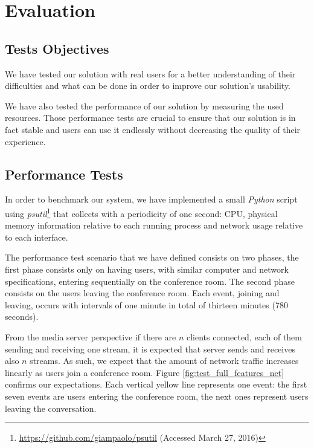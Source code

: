 \documentclass[conference,compsoc,a4paper]{IEEEtran}
\begin{document}
\section{Evaluation}


\subsection{Tests Objectives}

  We have tested our solution with real users for a better understanding of their difficulties and what can be done in order to improve our solution's usability.

  We have also tested the performance of our solution by measuring the used resources. Those performance tests are crucial to ensure that our solution is in fact stable and users can use it endlessly without decreasing the quality of their experience. 


  \subsection {Performance Tests}

      In order to benchmark our system, we have implemented a small \emph{Python} script using \emph{psutil}\footnote{\url{https://github.com/giampaolo/psutil} (Accessed March 27, 2016)} that collects with a periodicity of one second: CPU, physical memory information relative to each running process and network usage relative to each interface. 

      The performance test scenario that we have defined consists on two phases, the first phase consists only on having users, with similar computer and network specifications, entering sequentially on the conference room. The second phase consists on the users leaving the conference room. Each event, joining and leaving, occurs with intervals of one minute in total of thirteen minutes (780 seconds).
  
      From the media server perspective if there are $n$ clients connected, each of them sending and receiving one stream, it is expected that server sends and receives also $n$ streams. As such, we expect that the amount of network traffic increases linearly as users join a conference room. Figure \ref{fig:test_full_features_net} confirms our expectations. Each vertical yellow line represents one event: the first seven events are users entering the conference room, the next ones represent users leaving the conversation. 
     
\end{document}
